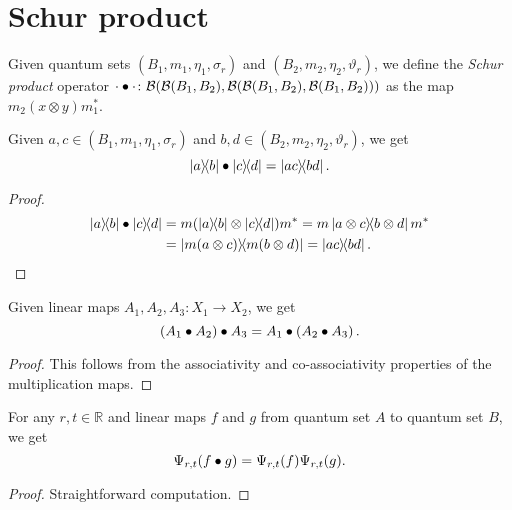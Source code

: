 \chapter{Schur product}

 \begin{definition}\label{schurMul}
  \leanok
  Given quantum sets $(B_1,m_1,\eta_1,\sigma_r)$ and $(B_2,m_2,\eta_2,\vartheta_r)$, we define the \textit{Schur product} operator $\cdot\bullet\cdot\colon\mathcal{B}(\mathcal{B}(B_1,B_2),\mathcal{B}(\mathcal{B}(B_1,B_2),\mathcal{B}(B_1,B_2)))$ as the map $m_2(x\otimes y)m_1^*$.
 \end{definition}

 \begin{lemma}\label{schurMul.apply_rankOne}
  \leanok
  Given $a,c\in(B_1,m_1,\eta_1,\sigma_r)$ and $b,d\in(B_2,m_2,\eta_2,\vartheta_r)$, we get
  \[\left\lvert a\right\rangle\!\!\left\langle b\right\rvert\bullet\left\lvert c\right\rangle\!\!\left\langle d\right\rvert=\left\lvert ac\right\rangle\!\!\left\langle bd\right\rvert.\]
 \end{lemma}
 \begin{proof}
  \leanok
  \begin{align*}
   \irdN{\ketbra{a}{b}}{\ketbra{c}{d}} &= m(\ketbra{a}{b}\otimes\ketbra{c}{d})m^*
   = m\ketbra{a\otimes c}{b\otimes d}m^*\\
   &= \ketbra{m(a\otimes c)}{m(b\otimes d)}=\ketbra{ac}{bd}.
  \end{align*}
 \end{proof}

 \begin{corollary}\label{schurMul_assoc}
  \leanok
  Given linear maps $A_1,A_2,A_3\colon X_1\to X_2$, we get
  \[\left({A_1}\bullet{A_2}\right)\bullet{A_3}={A_1}\bullet\left({A_2}\bullet{A_3}\right).\]
 \end{corollary}
 \begin{proof}\leanok
  This follows from the associativity and co-associativity properties of the multiplication maps.
 \end{proof}

 \begin{lemma}\label{Psi.schurMul}
  \leanok
  For any $r,t\in\mathbb{R}$ and linear maps $f$ and $g$ from quantum set $A$ to quantum set $B$, we get
  \[\Psi_{r,t}({f}\bullet{g})=\Psi_{r,t}(f)\Psi_{r,t}(g).\]
 \end{lemma}
 \begin{proof}\leanok
  Straightforward computation.
 \end{proof}
